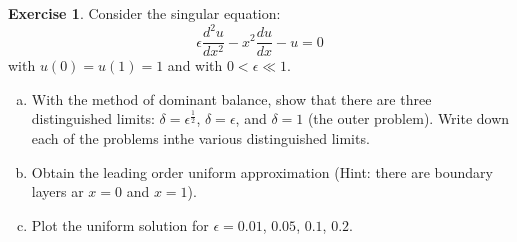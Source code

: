 \documentclass[12pt]{article}
\theoremstyle{definition}
\newtheorem{exer}{Exercise}
\theoremstyle{remark}
\begin{document}
\newpage

\begin{exer}

Consider the singular equation:
\begin{equation*}
    \epsilon \frac{d^{2} u}{dx^{2}} - x^{2} \frac{d u}{d x} - u = 0
\end{equation*}
with $u(0) = u(1) = 1$ and with $0 < \epsilon \ll 1$.
\begin{enumerate}[(a)]
    \item With the method of dominant balance, show that there are three distinguished limits: $\delta = \epsilon^{\frac{1}{2}}$, $\delta = \epsilon$, and  $\delta = 1$ (the outer problem). Write down each of the problems inthe various distinguished limits.
    \item Obtain the leading order uniform approximation (Hint: there are boundary layers ar $x = 0$ and $x= 1$).
    \item Plot the uniform solution for $\epsilon = 0.01$, $0.05$,  $0.1$,  $0.2$.
\end{enumerate}
\end{exer}
\end{document}
